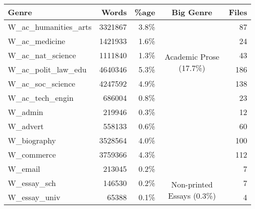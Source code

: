 \begin{table}[Ht]
    \centering

    \begin{tabular}{lrrcr}
        Genre                              & Words    & \%age    & Big Genre                                               & Files \\ \hline
        W\_ac\_humanities\_arts            & 3321867  & 3.8\%   & \multirow{6}{*}{\parbox{2.1cm}{Academic Prose (17.7\%)}}                & 87    \\
        W\_ac\_medicine                    & 1421933  & 1.6\%   &                                                         & 24    \\
        W\_ac\_nat\_science                & 1111840  & 1.3\%   &                                                         & 43    \\
        W\_ac\_polit\_law\_edu             & 4640346  & 5.3\%   &                                                         & 186   \\
        W\_ac\_soc\_science                & 4247592  & 4.9\%   &                                                         & 138   \\
        W\_ac\_tech\_engin                 & 686004   & 0.8\%   &                                                         & 23    \\ \cline{4-4}
        W\_admin                           & 219946   & 0.3\%   &                                                         & 12    \\
        W\_advert                          & 558133   & 0.6\%   &                                                         & 60    \\
        W\_biography                       & 3528564  & 4.0\%   &                                                         & 100   \\
        W\_commerce                        & 3759366  & 4.3\%   &                                                         & 112   \\
        W\_email                           & 213045   & 0.2\%   &                                                         & 7     \\ \cline{4-4}
        W\_essay\_sch                      & 146530   & 0.2\%   & \multirow{2}{*}{\parbox{2.1cm}{Non-printed Essays (0.3\%)}}             & 7     \\
        W\_essay\_univ                     & 65388    & 0.1\%   &                                                         & 4     \\ \cline{4-4}

\end{tabular}
\end{table}
